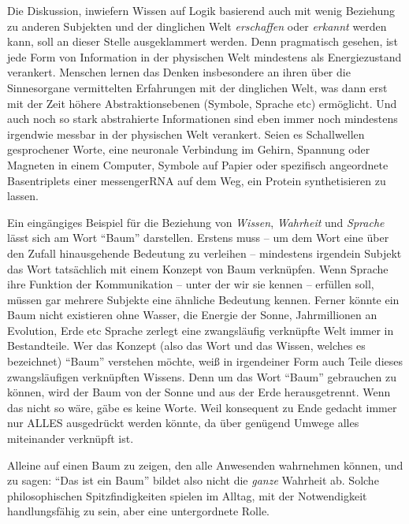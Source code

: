 Die Diskussion, inwiefern Wissen auf Logik basierend auch mit wenig Beziehung zu anderen Subjekten und der dinglichen Welt \emph{erschaffen} oder \emph{erkannt} werden kann, soll an dieser Stelle ausgeklammert werden. Denn pragmatisch gesehen, ist jede Form von Information in der physischen Welt mindestens als Energiezustand verankert. Menschen lernen das Denken insbesondere an ihren über die Sinnesorgane vermittelten Erfahrungen mit der dinglichen Welt, was dann erst mit der Zeit höhere Abstraktionsebenen (Symbole, Sprache \gls{etc}) ermöglicht. Und auch noch so stark abstrahierte Informationen sind eben immer noch mindestens irgendwie messbar in der physischen Welt verankert. Seien es Schallwellen gesprochener Worte, eine neuronale Verbindung im Gehirn, Spannung oder Magneten in einem Computer, Symbole auf Papier oder spezifisch angeordnete Basentriplets einer messengerRNA auf dem Weg, ein Protein synthetisieren zu lassen. 

Ein eingängiges Beispiel für die Beziehung von \emph{Wissen}, \emph{Wahrheit} und \emph{Sprache} lässt sich am Wort \enquote{Baum} darstellen. Erstens muss -- um dem Wort eine über den Zufall hinausgehende Bedeutung zu verleihen -- mindestens irgendein Subjekt das Wort tatsächlich mit einem Konzept von Baum verknüpfen. Wenn Sprache ihre Funktion der Kommunikation -- unter der wir sie kennen -- erfüllen soll, müssen gar mehrere Subjekte eine ähnliche Bedeutung kennen.
Ferner könnte ein Baum nicht existieren ohne Wasser, die Energie der Sonne, Jahrmillionen an Evolution, Erde \gls{etc} Sprache zerlegt eine zwangsläufig verknüpfte Welt immer in Bestandteile. 
Wer das Konzept (also das Wort und das Wissen, welches es bezeichnet) \enquote{Baum} verstehen möchte, weiß in irgendeiner Form auch Teile dieses zwangsläufigen verknüpften Wissens. Denn um das Wort \enquote{Baum} gebrauchen zu können, wird der Baum von der Sonne und aus der Erde herausgetrennt. Wenn das nicht so wäre, gäbe es keine Worte. Weil konsequent zu Ende gedacht immer nur ALLES ausgedrückt werden könnte, da über genügend Umwege alles miteinander verknüpft ist.

Alleine auf einen Baum zu zeigen, den alle Anwesenden wahrnehmen können, und zu sagen: \enquote{Das ist ein Baum} bildet also nicht die \emph{ganze} Wahrheit ab. Solche philosophischen Spitzfindigkeiten spielen im Alltag, mit der Notwendigkeit handlungsfähig zu sein, aber eine untergordnete Rolle. %

